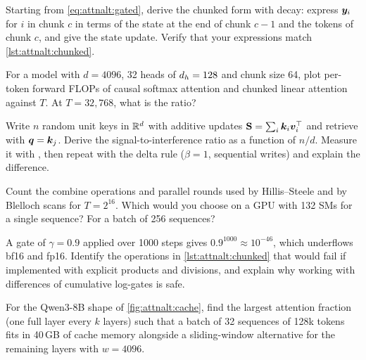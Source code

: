 \begin{exercise}
Starting from \cref{eq:attnalt:gated}, derive the chunked form with decay: express $\bm{y}_i$ for $i$ in chunk
$c$ in terms of the state at the end of chunk $c-1$ and the tokens of chunk $c$, and give the state update.
Verify that your expressions match \cref{lst:attnalt:chunked}.
\end{exercise}

\begin{exercise}[Crossover]
For a model with $d=4096$, 32 heads of $d_{h}=128$ and chunk size 64, plot per-token forward FLOPs of causal
softmax attention and chunked linear attention against $T$. At $T=32{,}768$, what is the ratio?
\end{exercise}

\begin{exercise}
Write $n$ random unit keys in $\mathbb{R}^{d}$ with additive updates $\mathbf{S}=\sum_i\bm{k}_i\bm{v}_i^\top$ and
retrieve with $\bm{q}=\bm{k}_j$. Derive the signal-to-interference ratio as a function of $n/d$. Measure
it with , then repeat with the delta rule ($\beta=1$, sequential writes) and
explain the difference.
\end{exercise}

\begin{exercise}
Count the combine operations and parallel rounds used by Hillis--Steele and by Blelloch scans for $T=2^{16}$.
Which would you choose on a GPU with 132 SMs for a single sequence? For a batch of 256 sequences?
\end{exercise}

\begin{exercise}[Underflow]
A gate of $\gamma=0.9$ applied over 1000 steps gives $0.9^{1000}\approx10^{-46}$, which underflows bf16 and
fp16. Identify the operations in \cref{lst:attnalt:chunked} that would fail if implemented with explicit
products and divisions, and explain why working with differences of cumulative log-gates is safe.
\end{exercise}

\begin{exercise}
For the Qwen3-8B shape of \cref{fig:attnalt:cache}, find the largest attention fraction (one full layer every
$k$ layers) such that a batch of 32 sequences of 128k tokens fits in 40\,GB of cache memory alongside a
sliding-window alternative for the remaining layers with $w=4096$.
\end{exercise}

